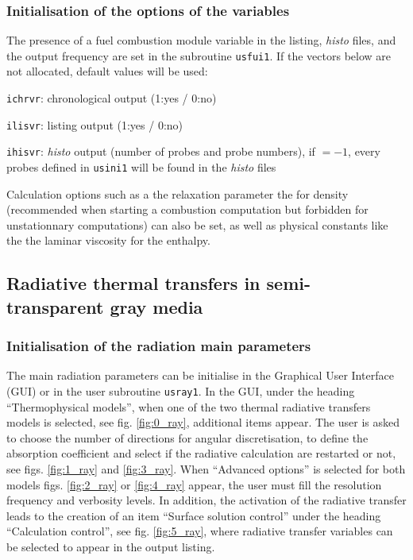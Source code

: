 {{{%
\subsubsection{Initialisation of the options of the variables}

The presence of a fuel combustion module variable in the listing, {\itshape histo} files, and the output frequency are set in the subroutine \texttt{usfui1}. If the vectors below are not allocated, default values will be used:
\begin{list}{-}{}
\item \texttt{ichrvr}: chronological output (1:yes / 0:no)
\item \texttt{ilisvr}: listing output (1:yes / 0:no)
\item \texttt{ihisvr}: {\itshape histo} output (number of probes and probe numbers), if $= -1$, every probes defined in \texttt{usini1} will be found in the {\itshape histo} files
\end{list}

Calculation options such as a the relaxation parameter the for density (recommended when starting a combustion computation but forbidden for unstationnary computations) can also be set, as well as physical constants like the the laminar viscosity for the enthalpy.

\subsection{Radiative thermal transfers in semi-transparent gray media}
\subsubsection{Initialisation of the radiation main parameters}

The main radiation parameters can be initialise in the Graphical User Interface (GUI) or in the user subroutine \texttt{usray1}. In the GUI, under the heading ``Thermophysical models'', when one of the two thermal radiative transfers models is selected, see fig. \ref{fig:0_ray}, additional items appear. The user is asked to choose the number of directions for angular discretisation, to define the absorption coefficient and select if the radiative calculation are restarted or not, see figs. \ref{fig:1_ray} and \ref{fig:3_ray}. When ``Advanced options'' is selected for both models figs. \ref{fig:2_ray} or \ref{fig:4_ray} appear, the user must fill the resolution frequency and verbosity levels. In addition, the activation of the radiative transfer leads to the creation of an item ``Surface solution control'' under the heading ``Calculation control'', see fig. \ref{fig:5_ray}, where radiative transfer variables can be selected to appear in the output listing.

}}}

